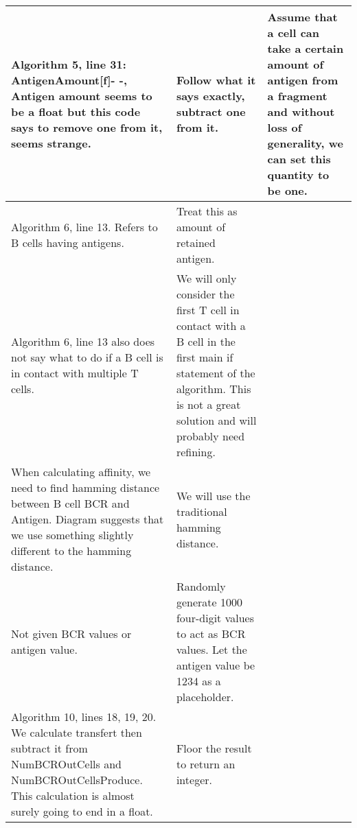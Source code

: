 \documentclass[english]{article}
\begin{document}
\begin{center}
\begin{longtable}{|>{\centering}p{2.1in}|>{\centering}p{2.1in}|>{\centering}p{2.1in}|}
Algorithm 5, line 31: AntigenAmount[f]- -, Antigen amount seems to be a float but this code says to remove one from it, seems strange. & Follow what it says exactly, subtract one from it. & Assume that a cell can take a certain amount of antigen from a fragment and without loss of generality, we can set this quantity to be one. 
\tabularnewline
\hline 

Algorithm 6, line 13. Refers to B cells having antigens. & Treat this as amount of retained antigen. & 
\tabularnewline
\hline

Algorithm 6, line 13 also does not say what to do if a B cell is in contact with multiple T cells. & We will only consider the first T cell in contact with a B cell in the first main if statement of the algorithm. This is not a great solution and will probably need refining.  & 
\tabularnewline
\hline

When calculating affinity, we need to find hamming distance between B cell BCR and Antigen. Diagram suggests that we use something slightly different to the hamming distance. & We will use the traditional hamming distance. &
\tabularnewline
\hline

Not given BCR values or antigen value. & Randomly generate 1000 four-digit values to act as BCR values. Let the antigen value be 1234 as a placeholder. &
\tabularnewline
\hline

Algorithm 10, lines 18, 19, 20. We calculate transfert then subtract it from NumBCROutCells and NumBCROutCellsProduce. This calculation is almost surely going to end in a float. & Floor the result to return an integer. & 
\tabularnewline
\hline


\end{longtable}
\par\end{center}
\end{document}
